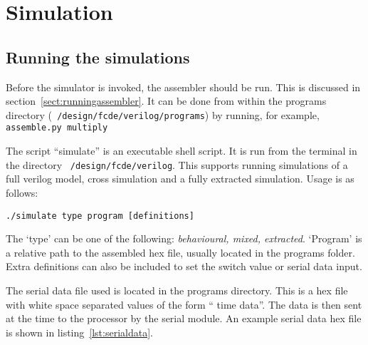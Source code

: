 
\section{Simulation}

\subsection{Running the simulations}




Before the simulator is invoked, the assembler should be run. 
This is discussed in section~\ref{sect:runningassembler}. 
It can be done from within the programs directory (\texttt{~/design/fcde/verilog/programs}) by running, for example, \texttt{assemble.py multiply}

The script ``simulate'' is an executable shell script. 
It is run from the terminal in the directory \texttt{~/design/fcde/verilog}. 
This supports running simulations of a full verilog model, cross simulation and a fully extracted simulation. 
Usage is as follows:\\
\begin{center}
\texttt{./simulate type program [definitions]}
\end{center}

The `type' can be one of the following: \textit{behavioural, mixed, extracted}.
`Program' is a relative path to the assembled hex file, usually located in the programs folder. 
Extra definitions can also be included to set the switch value or serial data input.

The serial data file used is located in the programs directory. 
This is a hex file with white space separated values of the form `` time data''. 
The data is then sent at the time to the processor by the serial module. 
An example serial data hex file is shown in listing~\ref{lst:serialdata}.



